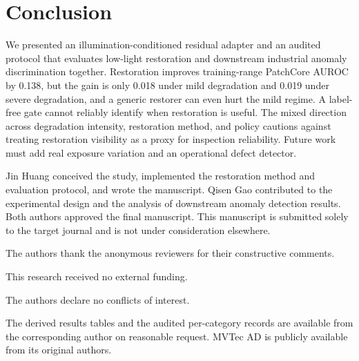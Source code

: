 \documentclass[ASNA,twocolumn]{USG}
\begin{document}
\section{Conclusion}
We presented an illumination-conditioned residual adapter and an audited protocol that evaluates low-light
restoration and downstream industrial anomaly discrimination together. Restoration improves training-range
PatchCore AUROC by 0.138, but the gain is only 0.018 under mild degradation and 0.019 under severe
degradation, and a generic restorer can even hurt the mild regime. A label-free gate cannot reliably
identify when restoration is useful. The mixed direction across degradation intensity, restoration method,
and policy cautions against treating restoration visibility as a proxy for inspection reliability. Future
work must add real exposure variation and an operational defect detector.

Jin Huang conceived the study, implemented the restoration method and evaluation protocol, and wrote the
manuscript. Qisen Gao contributed to the experimental design and the analysis of downstream anomaly
detection results. Both authors approved the final manuscript. This manuscript is submitted solely to the
target journal and is not under consideration elsewhere.

The authors thank the anonymous reviewers for their constructive comments.

This research received no external funding.

The authors declare no conflicts of interest.

The derived results tables and the audited per-category records are available from the corresponding author
on reasonable request. MVTec AD is publicly available from its original authors.


\end{document}
